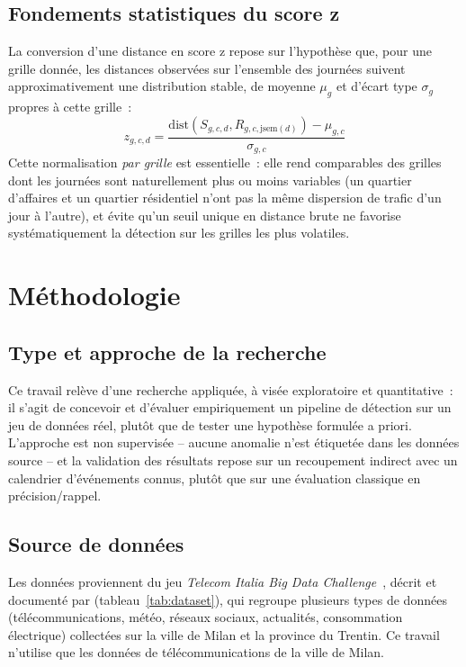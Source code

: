 \subsection{Fondements statistiques du score z}

La conversion d'une distance en score z repose sur l'hypothèse que,
pour une grille donnée, les distances observées sur l'ensemble des
journées suivent approximativement une distribution stable, de
moyenne $\mu_g$ et d'écart type $\sigma_g$ propres à cette grille~:
\begin{equation}
  z_{g,c,d} = \frac{\mathrm{dist}(S_{g,c,d}, R_{g,c,\mathrm{jsem}(d)}) - \mu_{g,c}}{\sigma_{g,c}}
\end{equation}
Cette normalisation \emph{par grille} est essentielle~: elle rend
comparables des grilles dont les journées sont naturellement plus ou
moins variables (un quartier d'affaires et un quartier résidentiel
n'ont pas la même dispersion de trafic d'un jour à l'autre), et évite
qu'un seuil unique en distance brute ne favorise systématiquement la
détection sur les grilles les plus volatiles.

\clearpage
\section{Méthodologie}
\label{sec:methodo}

\subsection{Type et approche de la recherche}

Ce travail relève d'une recherche appliquée, à visée exploratoire et
quantitative~: il s'agit de concevoir et d'évaluer empiriquement un
pipeline de détection sur un jeu de données réel, plutôt que de
tester une hypothèse formulée a priori. L'approche est non supervisée
-- aucune anomalie n'est étiquetée dans les données source -- et la
validation des résultats repose sur un recoupement indirect avec un
calendrier d'événements connus, plutôt que sur une évaluation
classique en précision/rappel.

\subsection{Source de données}

Les données proviennent du jeu \emph{Telecom Italia Big Data
Challenge}~\parencite{telecomitalia2015dataset}, décrit et documenté
par \textcite{barlacchi2015multisource} (tableau~\ref{tab:dataset}),
qui regroupe plusieurs types de données (télécommunications, météo,
réseaux sociaux, actualités, consommation électrique) collectées sur
la ville de Milan et la province du Trentin. Ce travail n'utilise que
les données de
télécommunications de la ville de Milan.

